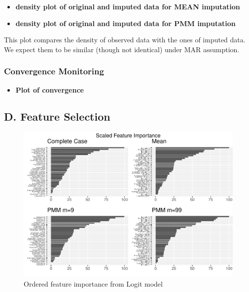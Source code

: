 \documentclass[12pt,]{article}
\providecommand{\tightlist}{%
  \setlength{\itemsep}{0pt}\setlength{\parskip}{0pt}}
\newcommand{\appendixD}{ \setcounter{table}{0} \renewcommand{\thetable}{D\arabic{table}} \setcounter{figure}{0} \renewcommand{\thefigure}{D\arabic{figure}} }
\begin{document}
\begin{itemize}
\tightlist
\item
  \textbf{density plot of original and imputed data for MEAN imputation}
\item
  \textbf{density plot of original and imputed data for PMM imputation}
\end{itemize}

This plot compares the density of observed data with the ones of imputed
data. We expect them to be similar (though not identical) under MAR
assumption.

\subsubsection{Convergence Monitoring}\label{convergence-monitoring}

\begin{itemize}
\tightlist
\item
  \textbf{Plot of convergence}
\end{itemize}

\subsection*{D. Feature Selection}\label{d.-feature-selection}

\appendixD

\begin{figure}[H]

{\centering \includegraphics[width=1\linewidth]{figure/graphics-unnamed-chunk-15-1} 

}

\caption{\label{fig:rfe-logit}Ordered feature importance from Logit model}\label{fig:unnamed-chunk-15}
\end{figure}
\end{document}
